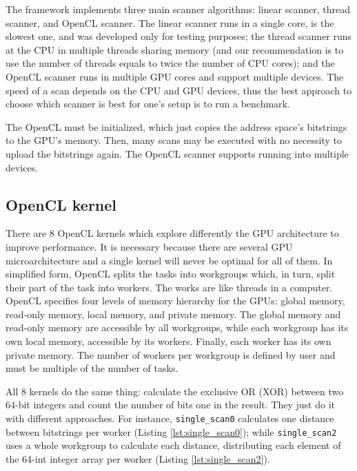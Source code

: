 The framework implements three main scanner algorithms: linear scanner, thread scanner, and OpenCL scanner. The linear scanner runs in a single core, is the slowest one, and was developed only for testing purposes; the thread scanner runs at the CPU in multiple threads sharing memory (and our recommendation is to use the number of threads equals to twice the number of CPU cores); and the OpenCL scanner runs in multiple GPU cores and support multiple devices. The speed of a scan depends on the CPU and GPU devices, thus the best approach to choose which scanner is best for one's setup is to run a benchmark.

The OpenCL must be initialized, which just copies the address space's bitstrings to the GPU's memory. Then, many scans may be executed with no necessity to upload the bitstrings again. The OpenCL scanner supports running into multiple devices.

\subsection{OpenCL kernel}

There are 8 OpenCL kernels which explore differently the GPU architecture to improve performance. It is necessary because there are several GPU microarchitecture and a single kernel will never be optimal for all of them. In simplified form, OpenCL splits the tasks into workgroups which, in turn, split their part of the task into workers. The works are like threads in a computer. OpenCL specifies four levels of memory hierarchy for the GPUs: global memory, read-only memory, local memory, and private memory. The global memory and read-only memory are accessible by all workgroups, while each workgroup has its own local memory, accessible by its workers. Finally, each worker has its own private memory. The number of workers per workgroup is defined by user and must be multiple of the number of tasks.

All 8 kernels do the same thing: calculate the exclusive OR (XOR) between two 64-bit integers and count the number of bits one in the result. They just do it with different approaches. For instance, \lstinline{single_scan0} calculates one distance between bitstrings per worker (Listing \ref{lst:single_scan0}); while \lstinline{single_scan2} uses a whole workgroup to calculate each distance, distributing each element of the 64-int integer array per worker (Listing \ref{lst:single_scan2}).

